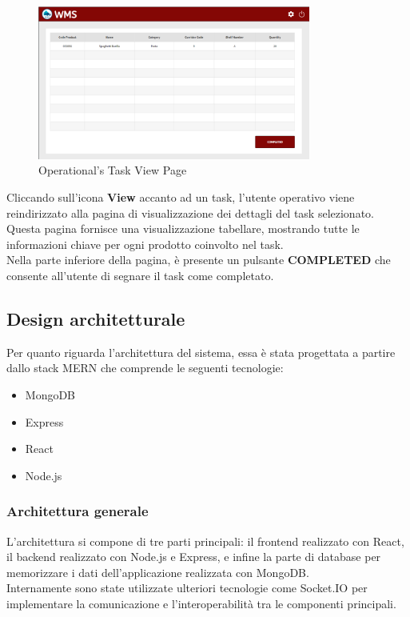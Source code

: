 \begin{figure}[H]
    \centering
    \includegraphics[width=0.8\textwidth]{document/sections/img/taskPageOp.png}
    \caption{Operational's Task View Page}
    \label{fig:taskPageOp}
\end{figure}
Cliccando sull'icona \textbf{View} accanto ad un task, l'utente operativo viene reindirizzato alla pagina di
visualizzazione dei dettagli del task selezionato.\\
Questa pagina fornisce una visualizzazione tabellare, mostrando tutte le informazioni chiave per ogni prodotto
coinvolto nel task.\\
Nella parte inferiore della pagina, è presente un pulsante \textbf{COMPLETED} che consente all'utente di
segnare il task come completato.


\subsection{Design architetturale}
Per quanto riguarda l'architettura del sistema, essa è stata progettata a partire dallo stack MERN che
comprende le seguenti tecnologie:
\begin{itemize}
    \item MongoDB
    \item Express
    \item React
    \item Node.js
\end{itemize}
\subsubsection{Architettura generale}

L'architettura si compone di tre parti principali: il frontend realizzato con React, il backend
realizzato con Node.js e Express, e infine la parte di database per memorizzare i dati dell'applicazione
realizzata con MongoDB.\\ Internamente sono state utilizzate ulteriori tecnologie come Socket.IO
per implementare la comunicazione e l'interoperabilità tra le componenti principali.

